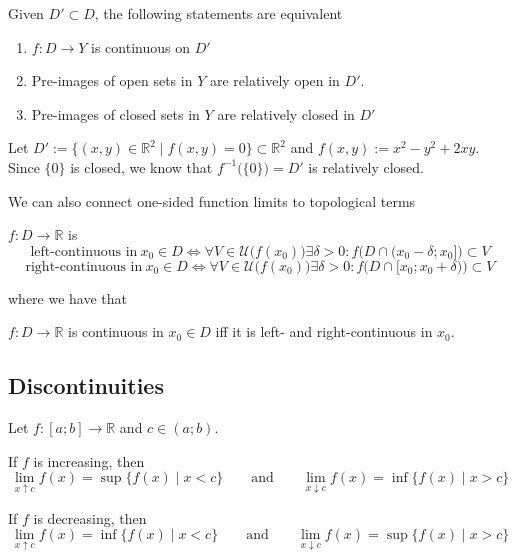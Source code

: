 \begin{theorem}
   Given \(D' \subset D\), the following statements are equivalent
   \begin{enumerate}[label=\roman*, align=Center]
      \item \(f: D \to Y\) is continuous on \(D'\)
      \item Pre-images of open sets in \(Y\) are relatively open in \(D'\).
      \item Pre-images of closed sets in \(Y\) are relatively closed in \(D'\)
   \end{enumerate}
\end{theorem}
\begin{example}
   Let \(D' := \{(x, y) \in \mathbb{R}^2 \mid f(x,y) = 0\} \subset \mathbb{R}^2\) and \(f(x,y) := x^2-y^2 + 2xy\).
   Since \(\{0\}\) is closed, we know that \(f^{-1}\big(\{0\}\big) = D'\) is relatively closed.
\end{example}
We can also connect one-sided function limits to topological terms
\begin{definition}
   \(f: D \to \mathbb{R}\) is
   \[\text{left-continuous in}~x_0 \in D \iff \forall V \in \mathcal{U}\big(f(x_0)\big) \exists \delta > 0: f\big(D \cap (x_0 - \delta; x_0]\big) \subset V\]
   \[\text{right-continuous in}~x_0 \in D \iff \forall V \in \mathcal{U}\big(f(x_0)\big) \exists \delta > 0: f\big(D \cap [x_0; x_0 + \delta)\big) \subset V\]
\end{definition}
where we have that
\begin{proposition}
   \(f: D \to \mathbb{R}\) is continuous in \(x_0 \in D\) iff it is left- and right-continuous in \(x_0\).
\end{proposition}

\subsection{Discontinuities}
\begin{proposition}\label{pro:one_sided_lim_incr}
   Let \(f: [a; b] \to \mathbb{R}\) and \(c \in (a; b)\).

   If \(f\) is increasing, then
   \[\lim_{x \uparrow c} f(x) = \sup\{f(x) \mid x < c\} \qquad\text{and}\qquad \lim_{x \downarrow c} f(x) = \inf\{f(x) \mid x > c\}\]

   If \(f\) is decreasing, then
   \[\lim_{x \uparrow c} f(x) = \inf\{f(x) \mid x < c\} \qquad\text{and}\qquad \lim_{x \downarrow c} f(x) = \sup\{f(x) \mid x > c\}\]
\end{proposition}

